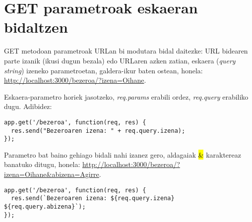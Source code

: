 \section{GET parametroak eskaeran bidaltzen}
GET metodoan parametroak URLan bi modutara bidal daitezke: URL bidearen parte izanik (ikusi dugun bezala) edo URLaren azken zatian, eskaera (\textit{query string}) izeneko parametroetan, galdera-ikur baten ostean, honela:\newline
\href{http://localhost:3000/bezeroa/?izena=Oihane}{http://localhost:3000/bezeroa/?izena=Oihane}.

Eskaera-parametro horiek jasotzeko, \textit{req.params} erabili ordez, \textit{req.query} erabiliko dugu. Adibidez:

\begin{lstlisting}[numbers=none]
app.get('/bezeroa', function(req, res) {
  res.send("Bezeroaren izena: " + req.query.izena);
});
\end{lstlisting}

Parametro bat baino gehiago bidali nahi izanez gero, aldagaiak \hl{\&} karaktereaz banatuko ditugu, honela: \href{http://localhost:3000/bezeroa/?izena=Oihane\&abizena=Agirre}{http://localhost:3000/bezeroa/?izena=Oihane\&abizena=Agirre}.

\begin{lstlisting}[numbers=none]
app.get('/bezeroa', function(req, res) {
  res.send(`Bezeroaren izena: ${req.query.izena} ${req.query.abizena}`);
});
\end{lstlisting}









